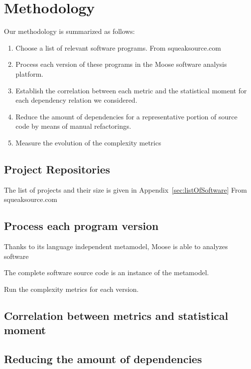 \documentclass{sig-alternate}
\newcommand{\seclabel}[1]{\label{sec:#1}}
\newcommand{\appref}[1]{Appendix~\ref{sec:#1}}
\begin{document}
\section{Methodology}\seclabel{methodology}

Our methodology is summarized as follows:

\begin{enumerate}
\item Choose a list of relevant software programs. From squeaksource.com
\item Process each version of these programs in the Moose software analysis platform. 
\item Establish the correlation between each metric and the statistical moment for each dependency relation we considered.
\item Reduce the amount of dependencies for a representative portion of source code by means of manual refactorings.
\item Measure the evolution of the complexity metrics
\end{enumerate}

\subsection{Project Repositories}

The list of projects and their size is given in \appref{listOfSoftware}
From squeaksource.com


\subsection{Process each program version}

Thanks to its language independent metamodel, Moose is able to analyzes software

The complete software source code is an instance of the metamodel.

Run the complexity metrics for each version.

\subsection{Correlation between metrics and statistical moment}



\subsection{Reducing the amount of dependencies}
\end{document}
